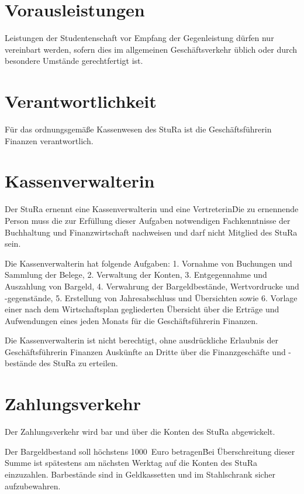 \begin{multicols}{2}
\section{Vorausleistungen}

\Abs \Satz Leistungen der Studentenschaft vor Empfang der Gegenleistung dürfen nur vereinbart werden, sofern dies im allgemeinen Geschäftsverkehr üblich oder durch besondere Umstände gerechtfertigt ist.



\section{Verantwortlichkeit}

\Abs \Satz Für das ordnungsgemäße Kassenwesen des StuRa ist die Geschäftsführerin Finanzen verantwortlich.



\section{Kassenverwalterin}

\Abs \Satz Der StuRa ernennt eine Kassenverwalterin und eine Vertreterin\. Die zu ernennende Person muss die zur Erfüllung dieser Aufgaben notwendigen Fachkenntnisse der Buchhaltung und Finanzwirtschaft nachweisen und darf nicht Mitglied des StuRa sein.

\Abs \Satz Die Kassenverwalterin hat folgende Aufgaben:
1. Vornahme von Buchungen und Sammlung der Belege,
2. Verwaltung der Konten,
3. Entgegennahme und Auszahlung von Bargeld,
4. Verwahrung der Bargeldbestände, Wertvordrucke und -gegenstände,
5. Erstellung von Jahresabschluss und Übersichten sowie
6. Vorlage einer nach dem Wirtschaftsplan gegliederten Übersicht über die Erträge und Aufwendungen eines jeden Monats für die Geschäftsführerin Finanzen.

\Abs \Satz Die Kassenverwalterin ist nicht berechtigt, ohne ausdrückliche Erlaubnis der Geschäftsführerin Finanzen Auskünfte an Dritte über die Finanzgeschäfte und -bestände des StuRa zu erteilen.



\section{Zahlungsverkehr}

\Abs \Satz Der Zahlungsverkehr wird bar und über die Konten des StuRa abgewickelt.

\Abs \Satz Der Bargeldbestand soll höchstens 1000~Euro betragen\. Bei Überschreitung dieser Summe ist spätestens am nächsten Werktag auf die Konten des StuRa einzuzahlen. Barbestände sind in Geldkassetten und im Stahlschrank sicher aufzubewahren.


\end{multicols}
